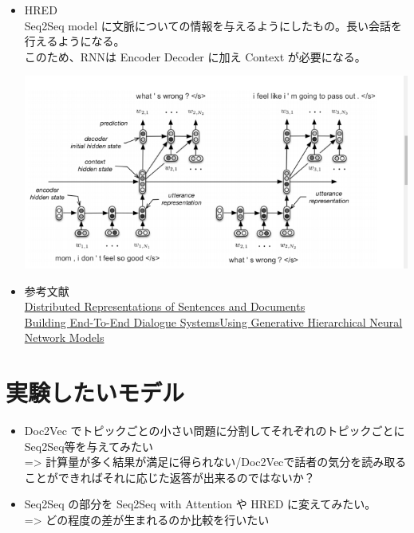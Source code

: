 \documentclass[dvipdfmx,10pt,presentation]{beamer}
\begin{document}
\begin{frame}[allowframebreaks]{}
\begin{itemize}
\item HRED\\
Seq2Seq model に文脈についての情報を与えるようにしたもの。長い会話を行えるようになる。\\
このため、RNNは Encoder Decoder に加え Context が必要になる。\\
\begin{center}
\includegraphics[width=.9\linewidth]{./hred.png}
\end{center}
\item 参考文献　\\
\href{https://cs.stanford.edu/\~quocle/paragraph\_vector.pdf}{Distributed Representations of Sentences and Documents}\\
\href{https://arxiv.org/pdf/1507.04808.pdf}{Building End-To-End Dialogue SystemsUsing Generative Hierarchical Neural Network Models}\\
\end{itemize}
\end{frame}
\section{実験したいモデル}
\label{sec:org7464197}
\begin{frame}[allowframebreaks]{}
\begin{itemize}
\item Doc2Vec でトピックごとの小さい問題に分割してそれぞれのトピックごとにSeq2Seq等を与えてみたい\\
=> 計算量が多く結果が満足に得られない/Doc2Vecで話者の気分を読み取ることができればそれに応じた返答が出来るのではないか？\\
\item Seq2Seq の部分を Seq2Seq with Attention や HRED に変えてみたい。\\
=> どの程度の差が生まれるのか比較を行いたい\\
\end{itemize}
\end{frame}
\end{document}
